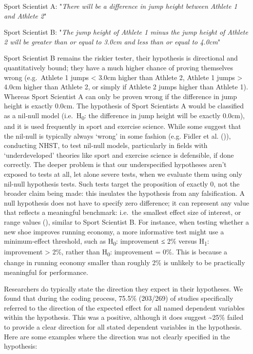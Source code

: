 \documentclass[
]{article}
\begin{document}
\begin{center}

Sport Scientist A: "\textit{There will be a difference in jump height between Athlete 1 and Athlete 2}"

Sport Scientist B: "\textit{The jump height of Athlete 1 minus the jump height of Athlete 2 will be greater than or equal to 3.0cm and less than or equal to 4.0cm}"

\end{center}

Sport Scientist B remains the riskier tester, their hypothesis is
directional and quantitatively bound; they have a much higher chance of
proving themselves wrong (e.g.~Athlete 1 jumps \textless{} 3.0cm higher
than Athlete 2, Athlete 1 jumps \textgreater{} 4.0cm higher than Athlete
2, or simply if Athlete 2 jumps higher than Athlete 1). Whereas Sport
Scientist A can only be proven wrong if the difference in jump height is
exactly 0.0cm. The hypothesis of Sport Scientists A would be classified
as a nil-null model (i.e.~H\textsubscript{0}: the difference in jump
height will be exactly 0.0cm), and it is used frequently in sport and
exercise science. While some suggest that the nil-null is typically
always `wrong' in some fashion (e.g. Fidler et al.
()), conducting NHST, to test
nil-null models, particularly in fields with `underdeveloped' theories
like sport and exercise science is defensible, if done correctly. The
deeper problem is that our underspecified hypotheses aren't exposed to
tests at all, let alone severe tests, when we evaluate them using only
nil-null hypothesis tests. Such tests target the proposition of exactly
0, not the broader claim being made: this insulates the hypothesis from
any falsification. A null hypothesis does not have to specify zero
difference; it can represent any value that reflects a meaningful
benchmark: i.e.~the smallest effect size of interest, or range values
(), similar to
Sport Scientist B. For instance, when testing whether a new shoe
improves running economy, a more informative test might use a
minimum-effect threshold, such as H\textsubscript{0}: improvement ≤ 2\%
versus H\textsubscript{1}: improvement \textgreater{} 2\%, rather than
H\textsubscript{0}: improvement = 0\%. This is because a change in
running economy smaller than roughly 2\% is unlikely to be practically
meaningful for performance.

Researchers do typically state the direction they expect in their
hypotheses. We found that during the coding process, 75.5\% (203/269) of
studies specifically referred to the direction of the expected effect
for all named dependent variables within the hypothesis. This was a
positive, although it does suggest \textasciitilde25\% failed to provide
a clear direction for all stated dependent variables in the hypothesis.
Here are some examples where the direction was not clearly specified in
the hypothesis:
\end{document}
